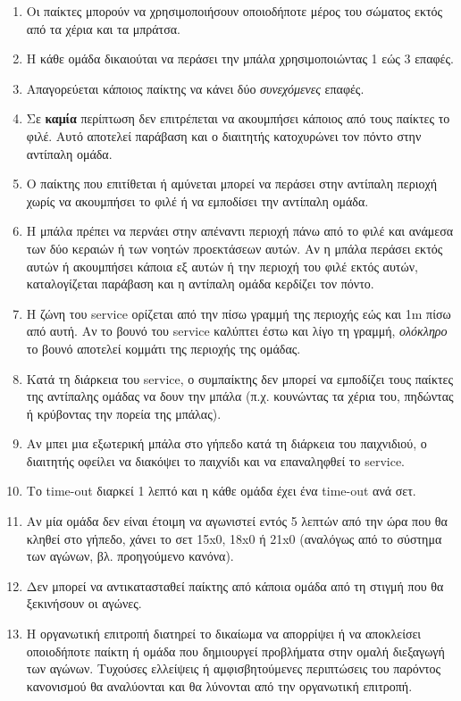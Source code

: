 \documentclass[a4paper,11pt]{article}
\begin{document}
\begin{enumerate}
\item Οι παίκτες μπορούν να χρησιμοποιήσουν οποιοδήποτε μέρος του σώματος εκτός
  από τα χέρια και τα μπράτσα.

\item Η κάθε ομάδα δικαιούται να περάσει την μπάλα χρησιμοποιώντας 1 εώς 3
  επαφές.

\item Απαγορεύεται κάποιος παίκτης να κάνει δύο \textit{συνεχόμενες} επαφές.

\item Σε \textbf{καμία} περίπτωση δεν επιτρέπεται να ακουμπήσει κάποιος από τους
  παίκτες το φιλέ. Αυτό αποτελεί παράβαση και ο διαιτητής κατοχυρώνει τον πόντο
  στην αντίπαλη ομάδα.

\item Ο παίκτης που επιτίθεται ή αμύνεται μπορεί να περάσει στην αντίπαλη
  περιοχή χωρίς να ακουμπήσει το φιλέ ή να εμποδίσει την αντίπαλη ομάδα.

\item Η μπάλα πρέπει να περνάει στην απέναντι περιοχή πάνω από το φιλέ και
  ανάμεσα των δύο κεραιών ή των νοητών προεκτάσεων αυτών. Αν η μπάλα περάσει
  εκτός αυτών ή ακουμπήσει κάποια εξ αυτών ή την περιοχή του φιλέ εκτός αυτών,
  καταλογίζεται παράβαση και η αντίπαλη ομάδα κερδίζει τον πόντο.

\item Η ζώνη του service ορίζεται από την πίσω γραμμή της περιοχής εώς και 1m
  πίσω από αυτή. Αν το βουνό του service καλύπτει έστω και λίγο τη γραμμή,
  \textit{ολόκληρο} το βουνό αποτελεί κομμάτι της περιοχής της ομάδας.

\item Κατά τη διάρκεια του service, ο συμπαίκτης δεν μπορεί να εμποδίζει τους
  παίκτες της αντίπαλης ομάδας να δουν την μπάλα (π.χ. κουνώντας τα χέρια του,
  πηδώντας ή κρύβοντας την πορεία της μπάλας).

\item Αν μπει μια εξωτερική μπάλα στο γήπεδο κατά τη διάρκεια του παιχνιδιού, ο
  διαιτητής οφείλει να διακόψει το παιχνίδι και να επαναληφθεί το service.

\item Το time-out διαρκεί 1 λεπτό και η κάθε ομάδα έχει ένα time-out ανά σετ.

\item Αν μία ομάδα δεν είναι έτοιμη να αγωνιστεί εντός 5 λεπτών από την ώρα που
  θα κληθεί στο γήπεδο, χάνει το σετ 15x0, 18x0 ή 21x0 (αναλόγως από το σύστημα
  των αγώνων, βλ. προηγούμενο κανόνα).

\item Δεν μπορεί να αντικατασταθεί παίκτης από κάποια ομάδα από τη στιγμή που θα
  ξεκινήσουν οι αγώνες.

\item Η οργανωτική επιτροπή διατηρεί το δικαίωμα να απορρίψει ή να αποκλείσει
  οποιοδήποτε παίκτη ή ομάδα που δημιουργεί προβλήματα στην ομαλή διεξαγωγή των
  αγώνων. Τυχούσες ελλείψεις ή αμφισβητούμενες περιπτώσεις του παρόντος
  κανονισμού θα αναλύονται και θα λύνονται από την οργανωτική επιτροπή.

\end{enumerate}
\end{document}
